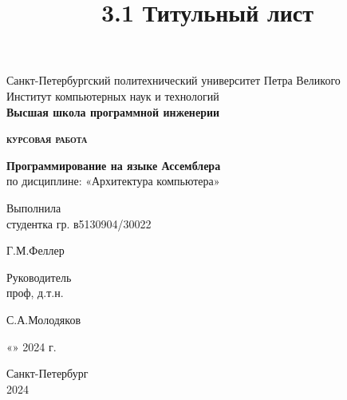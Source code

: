 \documentclass[a4paper,14pt]{article}
\title{3.1 Титульный лист}
\begin{document}
\thispagestyle{empty}    %

\begin{center}
    Санкт-Петербургский политехнический университет Петра Великого\\
    Институт компьютерных наук и технологий\\
    \bfseries{Высшая школа программной инженерии}
\end{center}

\vspace{20ex} %

\begin{center}
    \begin{huge} {\bfseries{\scshape курсовая работа}} \end{huge}

    \vspace{3ex}
    \textbf{Программирование на языке Ассемблера}\\
    по дисциплине: «Архитектура компьютера»
\end{center}

\vspace{30ex}

\noindent Выполнила\\
студентка гр. в5130904/30022\hfill \begin{minipage}{0.6\textwidth} \hfill Г.М.Феллер\end{minipage}

\vspace{3ex}

\noindent Руководитель\\
проф, д.т.н.\hfill \begin{minipage} {0.6\textwidth}\hfill С.А.Молодяков\end{minipage}

\vspace{3ex}

\hfill \begin{minipage}{0.6\textwidth} \hfill «\underline{\hspace{1cm}}»\underline{\hspace{3cm}} 2024 г.\end{minipage}

\vfill

\begin{center}
    Санкт-Петербург\\ 
    2024
\end{center}

\newpage %
\end{document}

